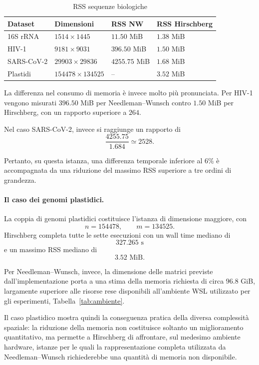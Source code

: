 \begin{table}[h]
    \centering
    \begin{tabular}{llll}
        \hline
        \textbf{Dataset} & \textbf{Dimensioni} &  \textbf{RSS NW} & \textbf{RSS Hirschberg}\\
        \hline
        16S rRNA   & $1514  \times 1445$     &  $11.50$ MiB   & $1.38$ MiB \\
        HIV-1      & $9181  \times 9031$     &  $396.50$ MiB  & $1.50$ MiB \\
        SARS-CoV-2 & $29903  \times 29836$   &  $4255.75$ MiB & $1.68$ MiB \\
        Plastidi   & $154478  \times 134525$ &  --            & $3.52$ MiB \\
        \hline
    \end{tabular}
    \caption{RSS sequenze biologiche}
    \label{tab:spazio_sequenze_bio}
\end{table}

La differenza nel consumo di memoria è invece molto più pronunciata. Per HIV-1 vengono misurati $396.50$ MiB per
Needleman--Wunsch contro $1.50$ MiB per Hirschberg, con un rapporto superiore a $264$.

Nel caso SARS-CoV-2, invece si raggiunge un rapporto di
\[
    \frac{4255.75}{1.684}\simeq 2528.
\]

Pertanto, su questa istanza, una differenza temporale inferiore al $6$\% è accompagnata da una riduzione del massimo RSS superiore a tre ordini di grandezza.

\paragraph{Il caso dei genomi plastidici.} La coppia di genomi plastidici costituisce l'istanza di dimensione maggiore, con
\[
    n=154478,\qquad m = 134525.
\]
Hirschberg completa tutte le sette esecuzioni con un wall time mediano di
\[
    327.265 \text{ s}
\]
e un massimo RSS mediano di
\[
    3.52 \text{ MiB}.
\]

Per Needleman--Wunsch, invece, la dimensione delle matrici previste dall'implementazione porta a una stima della memoria richiesta
di circa $96.8$ GiB, largamente superiore alle risorse rese disponibili all'ambiente WSL utilizzato per gli esperimenti, Tabella~\ref{tab:ambiente}.

Il caso plastidico mostra quindi la conseguenza pratica della diversa complessità spaziale: la riduzione della memoria non costituisce soltanto
un miglioramento quantitativo, ma permette a Hirschberg di affrontare, sul medesimo ambiente hardware, istanze per le quali la rappresentazione
completa utilizzata da Needleman--Wunsch richiederebbe una quantità di memoria non disponibile.

